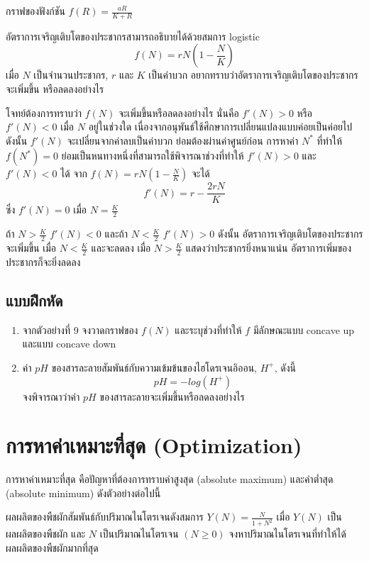 \documentclass[
]{book}
\begin{document}
กราฟของฟังก์ชัน {\(f(R)=\frac{aR}{K+R}\)}

อัตราการเจริญเติบโตของประชากรสามารถอธิบายได้ด้วยสมการ logistic
\[f(N)=rN(1- \frac{N}{K})\] เมื่อ \(N\) เป็นจำนวนประชากร, \(r\) และ \(K\)
เป็นค่าบวก อยากทราบว่าอัตราการเจริญเติบโตของประชากรจะเพิ่มขึ้น หรือลดลงอย่างไร

โจทย์ต้องการทราบว่า \(f(N)\) จะเพิ่มขึ้นหรือลดลงอย่างไร นั่นคือ \(f'(N)>0\) หรือ
\(f'(N)<0\) เมื่อ \(N\) อยู่ในช่วงใด
เนื่องจากอนุพันธ์ใช้ศึกษาการเปลี่ยนแปลงแบบค่อยเป็นค่อยไป ดังนั้น \(f'(N)\)
จะเปลี่ยนจากค่าลบเป็นค่าบวก ย่อมต้องผ่านค่าศูนย์ก่อน การหาค่า \(N^*\) ที่ทำให้
\(f(N^*)=0\) ย่อมเป็นหนทางหนึ่งที่สามารถใช้พิจารณาช่วงที่ทำให้ \(f'(N)>0\) และ
\(f'(N)<0\) ได้ จาก \(\displaystyle f(N)=rN(1- \frac{N}{K})\) จะได้
\[f'(N)=r- \frac{2rN}{K}\] ซึ่ง \(f'(N)=0\) เมื่อ \(N = \frac{K}{2}\)

ถ้า \(\displaystyle N> \frac{K}{2}\) \(f'(N)<0\) และถ้า
\(\displaystyle N< \frac{K}{2}\) \(f'(N)>0\) ดังนั้น
อัตราการเจริญเติบโตของประชากรจะเพิ่มขึ้น เมื่อ \(\displaystyle N< \frac{K}{2}\)
และจะลดลง เมื่อ \(\displaystyle N> \frac{K}{2}\) แสดงว่าประชากรยิ่งหนาแน่น
อัตราการเพิ่มของประชากรก็จะยิ่งลดลง

\subsection{แบบฝึกหัด}\label{uxe41uxe1auxe1auxe1duxe01uxe2buxe14-5}

\begin{enumerate}
\def\labelenumi{\arabic{enumi}.}
\item
  จากตัวอย่างที่ 9 จงวาดกราฟของ \(f(N)\) และระบุช่วงที่ทำให้ \(f\) มีลักษณะแบบ
  concave up และแบบ concave down
\item
  ค่า \(pH\) ของสารละลายสัมพันธ์กับความเข้มข้นของไฮโดรเจนอิออน, \(H^+\), ดังนี้
  \[pH=-log(H^+)\] จงพิจารณาว่าค่า \(pH\) ของสารละลายจะเพิ่มขึ้นหรือลดลงอย่างไร
\end{enumerate}

\section{การหาค่าเหมาะที่สุด
(Optimization)}\label{uxe01uxe32uxe23uxe2buxe32uxe04uxe32uxe40uxe2buxe21uxe32uxe30uxe17uxe2auxe14-optimization}

การหาค่าเหมาะที่สุด คือปัญหาที่ต้องการทราบค่าสูงสุด (absolute maximum) และค่าต่ำสุด
(absolute minimum) ดังตัวอย่างต่อไปนี้

ผลผลิตของพืชผักสัมพันธ์กับปริมาณไนโตรเจนดังสมการ
\(\displaystyle Y(N)= \frac{N}{1+N^2}\) เมื่อ \(Y(N)\) เป็นผลผลิตของพืชผัก และ
\(N\) เป็นปริมาณไนโตรเจน \((N \ge 0)\)
จงหาปริมาณไนโตรเจนที่ทำให้ได้ผลผลิตของพืชผักมากที่สุด
\end{document}
